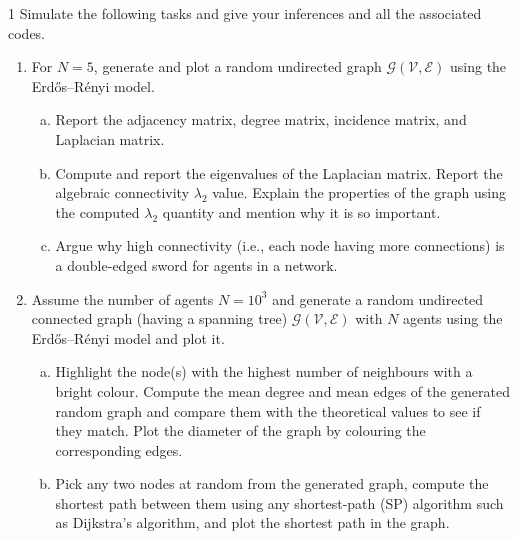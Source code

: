 \documentclass[a4paper, 11pt]{article}
\begin{document}

\begin{problem}{1}
Simulate the following tasks and give your inferences and all the associated codes.
\begin{enumerate}
    \item For $N=5$, generate and plot a random undirected graph $\mathcal{G}(\mathcal{V},\mathcal{E})$ using the Erd\H{o}s--R\'enyi model.
    \begin{enumerate}[(a)]
        \item Report the adjacency matrix, degree matrix, incidence matrix, and Laplacian matrix.
        \item Compute and report the eigenvalues of the Laplacian matrix. Report the algebraic connectivity $\lambda_2$ value. Explain the properties of the graph using the computed $\lambda_2$ quantity and mention why it is so important.
        \item Argue why high connectivity (i.e., each node having more connections) is a double-edged sword for agents in a network.
    \end{enumerate}
    \item Assume the number of agents $N=10^3$ and generate a random undirected connected graph (having a spanning tree) $\mathcal{G}(\mathcal{V},\mathcal{E})$ with $N$ agents using the Erd\H{o}s--R\'enyi model and plot it.
    \begin{enumerate}[(a)]
        \item Highlight the node(s) with the highest number of neighbours with a bright colour. Compute the mean degree and mean edges of the generated random graph and compare them with the theoretical values to see if they match. Plot the diameter of the graph by colouring the corresponding edges.
        \item Pick any two nodes at random from the generated graph, compute the shortest path between them using any shortest-path (SP) algorithm such as Dijkstra's algorithm, and plot the shortest path in the graph.
    \end{enumerate}
\end{enumerate}
\end{problem}
\end{document}

